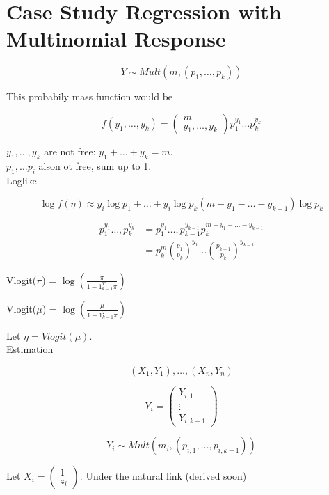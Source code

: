 \documentclass[11pt,fleqn]{book} %
\begin{document}
\section{Case Study Regression with Multinomial Response}

		$$Y \sim Mult(m, (p_1, \dots, p_k)) $$

This probabily mass function would be 

		$$f(y_1, \dots, y_k) = \begin{pmatrix}
			m\\
			y_1, \dots, y_k
		\end{pmatrix} p_1^{y_1} \dots p_k^{y_k}$$

$y_1, \dots, y_k$ are not free: $y_1 + \dots + y_k = m$.\\
$p_1, \dots p_i$ alson ot free, sum up to 1. \\


Loglike

		$$\log f(\eta) \approx y_i \log p_1 + \dots + y_i \log p_k (m - y_1 - \dots - y_{k-1}) \log p_k $$

		\begin{align*}
			p_1^{y_1} \dots, p_k^{y_k} &= p_1^{y_1} \dots, p_{k-1}^{y_{k-1}} p_k^{m - y_1 - \dots - y_{k-1}}\\
					&= p_k^m (\frac{p_1}{p_k})^{y_1} \dots (\frac{p_{k-1}}{p_k})^{y_{k-1}}
		\end{align*}



Vlogit($\pi$) = $\log (\frac{\pi}{1 - 1_{k-1}^T \pi})$

Vlogit($\mu$) = $\log(\frac{\mu}{1 - 1_{k-1}^T \pi})$

Let  $\eta = Vlogit(\mu) $.\\


Estimation

		$$(X_1, Y_1), \dots, (X_n, Y_n) $$

			$$Y_i = \begin{pmatrix}
				Y_{i, 1}\\
				\vdots\\
				Y_{i, k-1}
			\end{pmatrix} $$

			$$Y_i \sim Mult(m_i, (p_{i,1}, \dots, p_{i, k-1})) $$

Let $X_i = \begin{pmatrix}
	1\\
	z_i
\end{pmatrix}$. Under the natural link (derived soon) 
\end{document}
